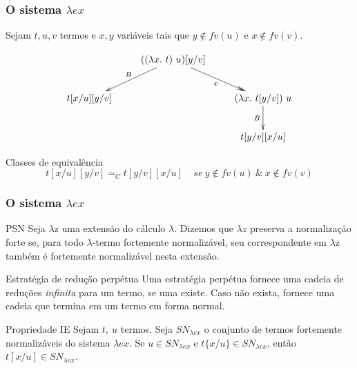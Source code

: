 \documentclass{beamer}
\begin{document}
\begin{frame}
\frametitle{O sistema $\lambda ex$}

Sejam $t, u, v$ termos e $x, y$ variáveis tais que $y \notin fv(u)$ e $x \notin
fv(v)$. 

\begin{table}[h]
\begin{displaymath}
        \xymatrix{ & ((\lambda x.\ t)\ u)[y/v] \ar[dl]_{B} \ar@{->>}[dr]_x &     \\
                  t[x/u][y/v] &               & (\lambda x.\ t[y/v])\ u \ar[d]_B \\
                              &               &  t[y/v][x/u]                    }
\end{displaymath}
\end{table}

\pause

\begin{block}{Classes de equivalência}
\[ t[x/u][y/v] =_C t[y/v][x/u] \ \ \ \ \ se\ y \notin fv(u)\ \&\ x \notin fv(v)\] 
\end{block}
    
\end{frame}



\begin{frame}
    \frametitle{O sistema $\lambda ex$}
    \begin{block}{PSN}
        Seja $\lambda$z uma extensão do cálculo $\lambda$. Dizemos que $\lambda z$
        preserva a normalização forte se, para todo $\lambda$-termo fortemente
        normalizável, seu correspondente em $\lambda$z também é fortemente
        normalizável nesta extensão.
    \end{block}

\end{frame}


\begin{frame}

    \begin{block}{ Estratégia de redução perpétua }
        Uma estratégia perpétua fornece uma cadeia de reduções \emph{infinita} para
        um termo, se uma existe. Caso não exista, fornece uma cadeia que termina em
        um termo em forma normal.
    \end{block}

    \pause
    
    \begin{block}{ Propriedade IE }
        Sejam $t,\ u$ termos. Seja $SN_{\lambda ex}$ o conjunto de termos fortemente
        normalizáveis do sistema $\lambda ex$. Se $u \in SN_{\lambda ex}$ e
        $t\{x/u\} \in SN_{\lambda ex}$, então $t[x/u] \in SN_{\lambda ex}$.
    \end{block}

\end{frame}
\end{document}
